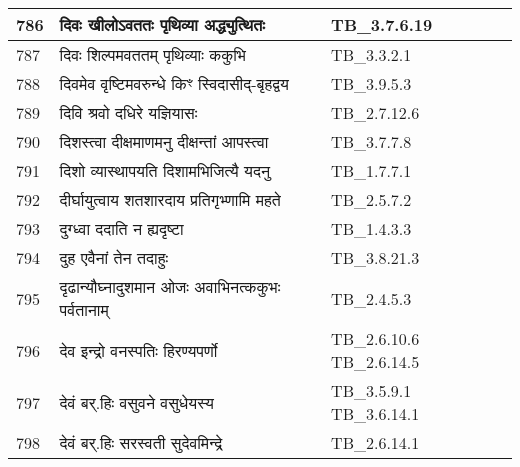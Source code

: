 \documentclass[17pt]{extarticle}
\begin{document}
\begin{longtable}{||p{0.4in}||p{4.9in}||p{0.9in}||}
    786 & दिवः खीलोऽवततः पृथिव्या अद्ध्युत्थितः & TB\_3.7.6.19       \\
    
    \hline
        
    787 & दिवः शिल्पमवततम् पृथिव्याः ककुभि & TB\_3.3.2.1       \\
    
    \hline
        
    788 & दिवमेव वृष्टिमवरुन्धे किꣳ स्विदासीद्{-}बृहद्वय & TB\_3.9.5.3       \\
    
    \hline
        
    789 & दिवि श्रवो दधिरे यज्ञियासः & TB\_2.7.12.6       \\
    
    \hline
        
    790 & दिशस्त्वा दीक्षमाणमनु दीक्षन्तां आपस्त्वा & TB\_3.7.7.8       \\
    
    \hline
        
    791 & दिशो व्यास्थापयति दिशामभिजित्यै यदनु & TB\_1.7.7.1       \\
    
    \hline
        
    792 & दीर्घायुत्वाय शतशारदाय प्रतिगृभ्णामि महते & TB\_2.5.7.2       \\
    
    \hline
        
    793 & दुग्ध्वा ददाति न ह्यदृष्टा & TB\_1.4.3.3       \\
    
    \hline
        
    794 & दुह एवैनां तेन तदाहुः & TB\_3.8.21.3       \\
    
    \hline
        
    795 & दृढान्यौघ्नादुशमान ओजः अवाभिनत्ककुभः पर्वतानाम् & TB\_2.4.5.3       \\
    
    \hline
        
    796 & देव इन्द्रो वनस्पतिः हिरण्यपर्णो & TB\_2.6.10.6 TB\_2.6.14.5       \\
    
    \hline
        
    797 & देवं बर्.हिः वसुवने वसुधेयस्य & TB\_3.5.9.1 TB\_3.6.14.1       \\
    
    \hline
        
    798 & देवं बर्.हिः सरस्वती सुदेवमिन्द्रे & TB\_2.6.14.1       \\
    

\end{longtable}
\end{document}
